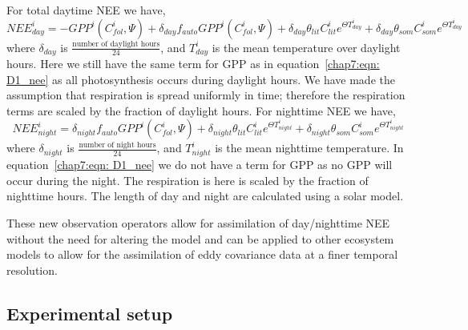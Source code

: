 For total daytime NEE we have,
\begin{equation}
NEE_{day}^{i} = -GPP^{i}(C_{fol}^{i}, \Psi) + \delta_{day}f_{auto}GPP^{i}(C_{fol}^{i}, \Psi) + \delta_{day}\theta_{lit}C_{lit}^i e^{\Theta T_{day}^{i}} + \delta_{day}\theta_{som}C_{som}^i e^{\Theta T_{day}^{i}} \label{chap7:eqn: D1_nee_day}
\end{equation}
where \(\delta_{day}\) is \(\frac{\text{number of daylight hours}}{24}\), and \(T_{day}^{i}\) is the mean temperature over daylight hours. Here we still have the same term for GPP as in equation~\eqref{chap7:eqn: D1_nee} as all photosynthesis occurs during daylight hours. We have made the assumption that respiration is spread uniformly in time; therefore the respiration terms are scaled by the fraction of daylight hours. For nighttime NEE we have,
\begin{equation}
NEE_{night}^{i} =  \delta_{night}f_{auto}GPP^{i}(C_{fol}^{i}, \Psi) + \delta_{night}\theta_{lit}C_{lit}^i e^{\Theta T_{night}^{i}} + \delta_{night}\theta_{som}C_{som}^i e^{\Theta T_{night}^{i}} \label{chap7:eqn: D1_nee_night}
\end{equation}
where \(\delta_{night}\) is \(\frac{\text{number of night hours}}{24}\), and \(T_{night}^{i}\) is the mean nighttime temperature. In equation~\eqref{chap7:eqn: D1_nee} we do not have a term for GPP as no GPP will occur during the night. The respiration is here is scaled by the fraction of nighttime hours. The length of day and night are calculated using a solar model.

 These new observation operators allow for assimilation of day/nighttime NEE without the need for altering the model and can be applied to other ecosystem models to allow for the assimilation of eddy covariance data at a finer temporal resolution. 

\subsection{Experimental setup}


